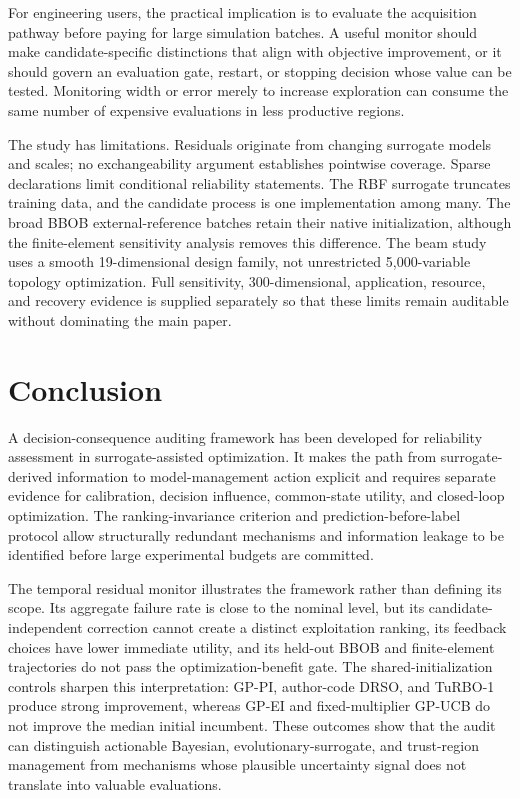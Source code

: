 \documentclass[cmc,article,submit,moreauthors,pdftex]{Definitions/tsp}
\begin{document}
For engineering users, the practical implication is to evaluate the acquisition pathway before paying for large simulation batches. A useful monitor should make candidate-specific distinctions that align with objective improvement, or it should govern an evaluation gate, restart, or stopping decision whose value can be tested. Monitoring width or error merely to increase exploration can consume the same number of expensive evaluations in less productive regions.

The study has limitations. Residuals originate from changing surrogate models and scales; no exchangeability argument establishes pointwise coverage. Sparse declarations limit conditional reliability statements. The RBF surrogate truncates training data, and the candidate process is one implementation among many. The broad BBOB external-reference batches retain their native initialization, although the finite-element sensitivity analysis removes this difference. The beam study uses a smooth 19-dimensional design family, not unrestricted 5,000-variable topology optimization. Full sensitivity, 300-dimensional, application, resource, and recovery evidence is supplied separately so that these limits remain auditable without dominating the main paper.

\hypertarget{conclusion}{%
\section{Conclusion}\label{conclusion}}

A decision-consequence auditing framework has been developed for reliability assessment in surrogate-assisted optimization. It makes the path from surrogate-derived information to model-management action explicit and requires separate evidence for calibration, decision influence, common-state utility, and closed-loop optimization. The ranking-invariance criterion and prediction-before-label protocol allow structurally redundant mechanisms and information leakage to be identified before large experimental budgets are committed.

The temporal residual monitor illustrates the framework rather than defining its scope. Its aggregate failure rate is close to the nominal level, but its candidate-independent correction cannot create a distinct exploitation ranking, its feedback choices have lower immediate utility, and its held-out BBOB and finite-element trajectories do not pass the optimization-benefit gate. The shared-initialization controls sharpen this interpretation: GP-PI, author-code DRSO, and TuRBO-1 produce strong improvement, whereas GP-EI and fixed-multiplier GP-UCB do not improve the median initial incumbent. These outcomes show that the audit can distinguish actionable Bayesian, evolutionary-surrogate, and trust-region management from mechanisms whose plausible uncertainty signal does not translate into valuable evaluations.
\end{document}
